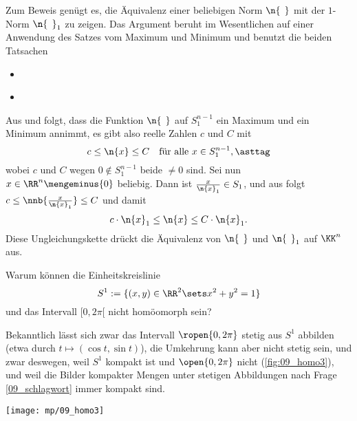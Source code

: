 \begin{antwort}
  Zum Beweis genügt es, die Äquivalenz einer beliebigen 
  Norm $\n{\;\,}$ mit der $1$-Norm $\n{\;\,}_1$ zu zeigen. 
  Das Argument beruht im Wesentlichen auf einer Anwendung des Satzes 
  vom Maximum und Minimum und benutzt die beiden Tatsachen
  {\setlength{\labelsep}{2mm}
    \begin{itemize}[2mm]
    \item[\desc{i}] 
        \\[-3mm]
    \item[\desc{ii}] 
    \end{itemize}}
  \noindent
  Aus  und  folgt, dass 
  die Funktion $\n{\;\,}$ auf $S^{n-1}_1$ ein Maximum und 
  ein Minimum annimmt, es gibt also reelle Zahlen 
  $c$ und $C$ mit 
  \begin{equation}
    c \le  \n{ x } \le C \quad\text{für alle $x\in S^{n-1}_1$}, 
    \asttag
  \end{equation}
  wobei $c$ und $C$ wegen $0\not\in S^{n-1}_1$ 
  beide $\not=0$ sind. Sei nun 
  $x\in \RR^n \mengeminus\{ 0 \}$ beliebig. Dann ist 
  $\frac{x}{\n{x}_1} \in S_1$, und 
  aus {\astref} folgt $c \le \nnb{ \frac{x}{\n{x}_1} } \le C$ und damit   
  \[
  c\cdot \n{x}_1 \le \n{x} \le C \cdot \n{x}_1.
  \]
  Diese Ungleichungskette drückt die Äquivalenz 
  von $\n{\,\;}$ und $\n{\,\;}_1$ auf $\KK^n$ aus. 
  \AntEnd
\end{antwort}

\begin{frage}
  Warum können die Einheitskreislinie 
  \[
  S^1 := \{ (x,y) \in \RR^2\sets x^2+y^2 =1 \} 
  \]
  und das Intervall $[ 0, 2\pi[ $ nicht homöomorph sein?
\end{frage}

\begin{antwort}
  Bekanntlich lässt sich zwar das Intervall $\ropen{0,2\pi}$ stetig 
  aus $S^1$ abbilden (etwa durch $t\mapsto \left( \cos t, 
    \sin t \right)$), die 
  Umkehrung kann aber nicht stetig sein, und zwar deswegen, weil 
  $S^1$ kompakt ist und $\open{0,2\pi}$ nicht (\sieheAbbildung\ref{fig:09_homo3}), und weil die Bilder kompakter Mengen 
  unter stetigen Abbildungen nach Frage \ref{09_schlagwort} 
  immer kompakt sind. 
  \AntEnd

  \begin{center}
    \texttt{[image: mp/09\_homo3]}
    \label{fig:09_homo3}
  \end{center}
\end{antwort}

